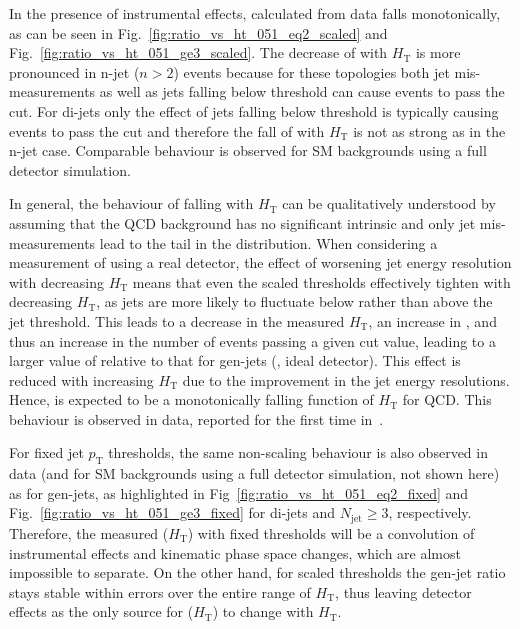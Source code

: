 In the presence of instrumental effects, \RaT calculated from data
falls monotonically, as can be seen in
Fig.~\ref{fig:ratio_vs_ht_051_eq2_scaled} and
Fig.~\ref{fig:ratio_vs_ht_051_ge3_scaled}. The decrease of \RaT with
$H_{\mathrm{T}}$ is more pronounced in n-jet ($n>2$) events because
for these topologies both jet mis-measurements as well as jets falling
below threshold can cause events to pass the \aT cut. For di-jets only
the effect of jets falling below threshold is typically causing events
to pass the cut and therefore the fall of \RaT with $H_{\mathrm{T}}$
is not as strong as in the n-jet case. Comparable behaviour is
observed for SM backgrounds using a full detector simulation.

In general, the behaviour of \RaT falling with $H_{\mathrm{T}}$ can be
qualitatively understood by assuming that the QCD background has no
significant intrinsic \mymet and only jet mis-measurements lead to the
tail in the \mymet distribution. When considering a measurement of
\RaT using a real detector, the effect of worsening jet energy
resolution with decreasing $H_{\mathrm{T}}$ means that even the scaled
\pt thresholds effectively tighten with decreasing $H_{\mathrm{T}}$,
as jets are more likely to fluctuate below rather than above the jet
\pt threshold. This leads to a decrease in the measured
$H_{\mathrm{T}}$, an increase in \MHT, and thus an increase in the
number of events passing a given \aT cut value, leading to a larger
value of \RaT relative to that for gen-jets (\ie, ideal
detector). This effect is reduced with increasing $H_{\mathrm{T}}$ due
to the improvement in the jet energy resolutions. Hence, \RaT is
expected to be a monotonically falling function of $H_{\mathrm{T}}$
for QCD. This behaviour is observed in data, reported for the
first time in~\cite{SUS-10-001}.

For fixed jet $p_{\mathrm{T}}$ thresholds, the same non-scaling
behaviour is also observed in data (and for SM backgrounds using a
full detector simulation, not shown here) as for gen-jets, as
highlighted in
Fig~\ref{fig:ratio_vs_ht_051_eq2_fixed} and
Fig.~\ref{fig:ratio_vs_ht_051_ge3_fixed} for di-jets and
$N_{\mathrm{jet}} \geq 3$, respectively. Therefore, the measured
\RaT($H_{\mathrm{T}}$) with fixed thresholds will be a convolution of
instrumental effects and kinematic phase space changes, which are
almost impossible to separate. On the other hand, for scaled
thresholds the gen-jet ratio stays stable within errors over the
entire range of $H_{\mathrm{T}}$, thus leaving detector effects as the
only source for \RaT($H_{\mathrm{T}}$) to change with
$H_{\mathrm{T}}$.

